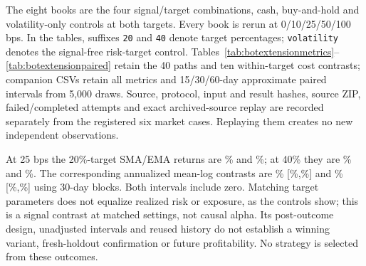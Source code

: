 The eight books are the four signal/target combinations, cash, buy-and-hold and
volatility-only controls at both targets. Every book is rerun at 0/10/25/50/100 bps.
In the tables, suffixes \texttt{20} and \texttt{40} denote target percentages;
\texttt{volatility} denotes the signal-free risk-target control.
Tables~\ref{tab:botextensionmetrics}--\ref{tab:botextensionpaired} retain the
40 paths and ten within-target cost contrasts; companion CSVs retain all
metrics and 15/30/60-day approximate paired intervals from 5,000 draws. Source,
protocol, input and result hashes, source ZIP, failed/completed attempts and
exact archived-source replay are recorded separately from the registered
six market cases. Replaying them creates no new independent observations.

At 25 bps the 20\%-target SMA/EMA returns are \BotSmaTwentyReturn\% and
\BotEmaTwentyReturn\%; at 40\% they are \BotSmaFortyReturn\% and
\BotEmaFortyReturn\%. The corresponding annualized mean-log contrasts are
\BotTwentyContrast\% [\BotTwentyContrastLower\%,\BotTwentyContrastUpper\%]
and \BotFortyContrast\% [\BotFortyContrastLower\%,\BotFortyContrastUpper\%]
using 30-day blocks. Both intervals include zero. Matching target parameters
does not equalize realized risk or exposure, as the controls show; this is a
signal contrast at matched settings, not causal alpha. Its post-outcome design,
unadjusted intervals and reused history do not establish a winning variant,
fresh-holdout confirmation or future profitability. No strategy is selected
from these outcomes.

\clearpage
\begingroup\footnotesize
\setlength{\LTpre}{4pt}
\setlength{\LTpost}{4pt}

\endgroup
